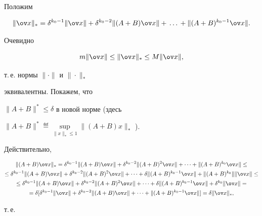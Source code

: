 Положим


$$


\|{\ov x}\|_*={\delta}^{k_0-1}\|{\ov x}\|+


{\delta}^{k_0-2}\|(A+B){\ov


x}\|+\,\dotsc\,+\| (A+B)^{k_0-1}{\ov x}\|.


$$


Очевидно


$$


m\|\ov x\|\le \|{\ov x}\|_*\le M\|{\ov x}\|,


$$


т.\,е. нормы $\|\cdot\|$ и $\|\cdot\|_*$


эквивалентны. Покажем, что 


$\|A+B\|^*\le {\delta}$ в новой норме (здесь


$\|A+B\|^*\eqdef \sup\limits_{\|x\|_*\le 1}\|(A+B)x\|_*$ ).


Действительно,


\begin{gather*}


\|(A+B){\ov x}\|_*={\delta}^{k_0-1}\|(A+B){\ov x}


\|+{\delta}^{k_0-2}\|(A+B)^2{\ov


x}\|+\dotsb+ \|(A+B)^{k_0}{\ov x}\|\le \\


%


\le {\delta}^{k_0-1}\|(A+B){\ov


x}\|+ {\delta}^{k_0-2}\|(A+B)^2{\ov


x}\|+\dotsb+ {\delta}\|(A+B)^{k_0-1}{\ov


x}\|+ \|(A+B)^{k_0}\|\|{\ov x}\|\le \\


%


\le {\delta}^{k_0-1}\|(A+B){\ov


x}\|+ {\delta}^{k_0-2}\|(A+B)^2{\ov


x}\|+\dotsb+ {\delta}\|(A+B)^{k_0-1}{\ov


x}\|+ {\delta}^{k_0}\|{\ov x}\|= \\


%


={\delta}[{\delta}^{k_0-1}\|{\ov x}\|+


{\delta}^{k_0-2}\|(A+B){\ov x}\|+\dotsb+


\|(A+B)^{k_0-1}{\ov x}\|]={\delta}\|{\ov x}\|_*,


\end{gather*}


т.\,е.


